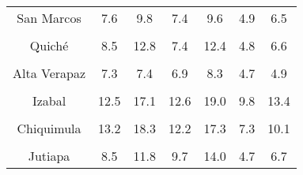 \begin{tabular}[t]{ccccccc}
San Marcos & 7.6 & 9.8 & 7.4 & 9.6 & 4.9 & 6.5\\
\cellcolor[HTML]{B6B3FF}{Huehuetenango} & \cellcolor[HTML]{B6B3FF}{12.5} & \cellcolor[HTML]{B6B3FF}{17.5} & \cellcolor[HTML]{B6B3FF}{11.2} & \cellcolor[HTML]{B6B3FF}{16.6} & \cellcolor[HTML]{B6B3FF}{6.8} & \cellcolor[HTML]{B6B3FF}{9.9}\\
Quiché & 8.5 & 12.8 & 7.4 & 12.4 & 4.8 & 6.6\\
\cellcolor[HTML]{B6B3FF}{Baja Verapaz} & \cellcolor[HTML]{B6B3FF}{9.7} & \cellcolor[HTML]{B6B3FF}{13.7} & \cellcolor[HTML]{B6B3FF}{10.1} & \cellcolor[HTML]{B6B3FF}{18.6} & \cellcolor[HTML]{B6B3FF}{5.2} & \cellcolor[HTML]{B6B3FF}{9.3}\\
Alta Verapaz & 7.3 & 7.4 & 6.9 & 8.3 & 4.7 & 4.9\\
\cellcolor[HTML]{B6B3FF}{Petén} & \cellcolor[HTML]{B6B3FF}{21.0} & \cellcolor[HTML]{B6B3FF}{28.9} & \cellcolor[HTML]{B6B3FF}{20.1} & \cellcolor[HTML]{B6B3FF}{28.1} & \cellcolor[HTML]{B6B3FF}{12.5} & \cellcolor[HTML]{B6B3FF}{16.8}\\
Izabal & 12.5 & 17.1 & 12.6 & 19.0 & 9.8 & 13.4\\
\cellcolor[HTML]{B6B3FF}{Zacapa} & \cellcolor[HTML]{B6B3FF}{11.8} & \cellcolor[HTML]{B6B3FF}{15.6} & \cellcolor[HTML]{B6B3FF}{9.2} & \cellcolor[HTML]{B6B3FF}{14.3} & \cellcolor[HTML]{B6B3FF}{6.0} & \cellcolor[HTML]{B6B3FF}{8.5}\\
Chiquimula & 13.2 & 18.3 & 12.2 & 17.3 & 7.3 & 10.1\\
\cellcolor[HTML]{B6B3FF}{Jalapa} & \cellcolor[HTML]{B6B3FF}{11.4} & \cellcolor[HTML]{B6B3FF}{14.4} & \cellcolor[HTML]{B6B3FF}{12.1} & \cellcolor[HTML]{B6B3FF}{17.9} & \cellcolor[HTML]{B6B3FF}{5.5} & \cellcolor[HTML]{B6B3FF}{8.4}\\
Jutiapa & 8.5 & 11.8 & 9.7 & 14.0 & 4.7 & 6.7\\
\bottomrule
\end{tabular}
